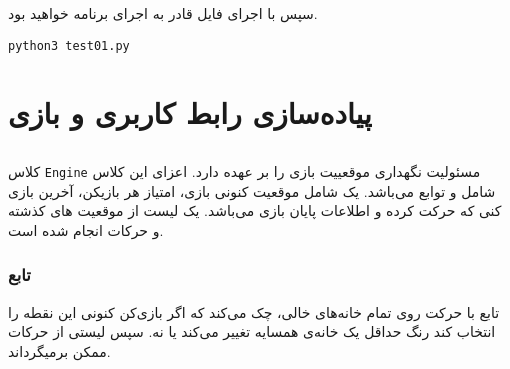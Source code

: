 سپس با اجرای فایل
قادر به اجرای برنامه خواهید بود.

\begin{latin}
\begin{lstlisting}
python3 test01.py
\end{lstlisting}
\end{latin}

\chapter{پیاده‌سازی رابط کاربری و  بازی}
\section{}
کلاس
\verb;Engine;
مسئولیت نگهداری موقعییت بازی را بر عهده دارد.
اعزای این کلاس شامل
و توابع
می‌باشد.
یک
شامل موقعیت کنونی بازی، امتیاز هر بازیکن، آخرین بازی کنی که حرکت کرده و  اطلاعات پایان بازی می‌باشد.
یک لیست از موقعیت ها‌ی کذشته و حرکات انجام شده است.

\subsection{تابع }

تابع 
با حرکت روی تمام خانه‌های خالی، چک می‌کند که اگر بازی‌کن کنونی این نقطه را انتخاب کند رنگ حداقل یک خانه‌ی همسایه تغییر می‌کند یا نه.
سپس لیستی از حرکات ممکن بر‌میگرداند.

